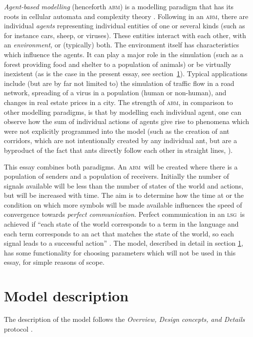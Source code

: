 \documentclass[
	DIV=calc,
	BCOR=0mm,
	pagesize,
]{scrartcl}
\newcommand{\abm}{\textsc{abm}}
\newcommand{\lsg}{\textsc{lsg}}
\newcommand{\odd}{\textsc{odd}}
\begin{document}
\emph{Agent-based modelling} (henceforth \abm) is a modelling paradigm that has its roots in cellular automata and complexity theory \citep{heath_some_2014}.
Following \citet{grimm_individual_2005,railsback_agent_2011} in an \abm, there are individual \emph{agents} representing individual entities of one or several kinds (such as for instance cars, sheep, or viruses).
These entities interact with each other, with an \emph{environment,} or (typically) both.
The environment itself has characteristics which influence the agents.
It can play a major role in the simulation (such as a forest providing food and shelter to a population of animals) or be virtually inexistent (as is the case in the present essay, see section~\ref{sec:mod}).
Typical applications include (but are by far not limited to) the simulation of traffic flow in a road network, spreading of a virus in a population (human or non-human), and changes in real estate prices in a city.
The strength of \abm, in comparison to other modelling paradigms, is that  by modelling each individual agent, one can observe how the sum of individual actions of agents give rise to phenomena which were not explicitly programmed into the model (such as the creation of ant corridors, which are not intentionally created by any individual ant, but are a byproduct of the fact that ants directly follow each other in straight lines, \citet{wilensky_netlogo_1997}).

This essay combines both paradigms.
An \abm\ will be created where there is a population of senders and a population of receivers.
Initially the number of signals available will be less than the number of states of the world and actions, but will be increased with time.
The aim is to determine how the time at or the condition on which more symbols will be made available influences the speed of convergence towards \emph{perfect communication.}
Perfect communication in an \lsg\ is achieved if ``each state of the world corresponds to a term in the language and each term corresponds to an act that matches the state of the world, so each signal leads to a successful action'' \citep[p.~530, there referred to as ``perfect Lewis signalling system'']{barrett_dynamic_2007}.
The model, described in detail in section \ref{sec:mod}, has some functionality for choosing parameters which will not be used in this essay, for simple reasons of scope.


\section{Model description}
\label{sec:mod}
The description of the model follows the \emph{Overview, Design concepts, and Details} protocol \citep[][henceforth \odd]{grimm_standard_2006, grimm_odd_2010}.
\end{document}
